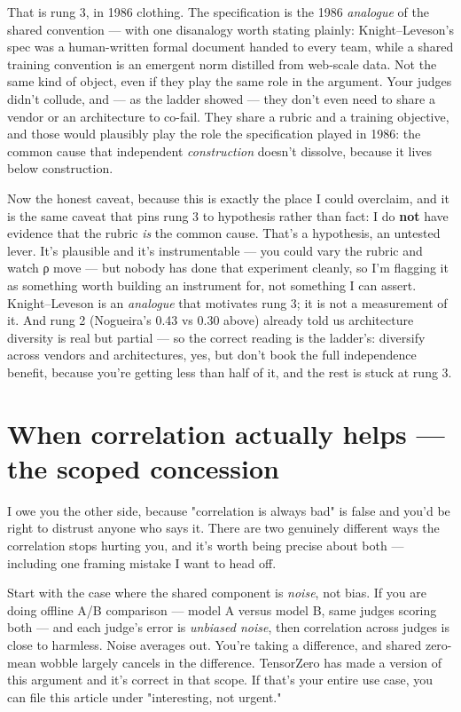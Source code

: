 \documentclass[11pt]{article}
\begin{document}
That is rung 3, in 1986 clothing. The specification is the 1986 \emph{analogue} of the shared convention — with one disanalogy worth stating plainly: Knight–Leveson's spec was a human-written formal document handed to every team, while a shared training convention is an emergent norm distilled from web-scale data. Not the same kind of object, even if they play the same role in the argument. Your judges didn't collude, and — as the ladder showed — they don't even need to share a vendor or an architecture to co-fail. They share a rubric and a training objective, and those would plausibly play the role the specification played in 1986: the common cause that independent \emph{construction} doesn't dissolve, because it lives below construction.

Now the honest caveat, because this is exactly the place I could overclaim, and it is the same caveat that pins rung 3 to hypothesis rather than fact: I do \textbf{not} have evidence that the rubric \emph{is} the common cause. That's a hypothesis, an untested lever. It's plausible and it's instrumentable — you could vary the rubric and watch ρ move — but nobody has done that experiment cleanly, so I'm flagging it as something worth building an instrument for, not something I can assert. Knight–Leveson is an \emph{analogue} that motivates rung 3; it is not a measurement of it. And rung 2 (Nogueira's 0.43 vs 0.30 above) already told us architecture diversity is real but partial — so the correct reading is the ladder's: diversify across vendors and architectures, yes, but don't book the full independence benefit, because you're getting less than half of it, and the rest is stuck at rung 3.

\section*{When correlation actually helps — the scoped concession}

I owe you the other side, because "correlation is always bad" is false and you'd be right to distrust anyone who says it. There are two genuinely different ways the correlation stops hurting you, and it's worth being precise about both — including one framing mistake I want to head off.

Start with the case where the shared component is \emph{noise}, not bias. If you are doing offline A/B comparison — model A versus model B, same judges scoring both — and each judge's error is \emph{unbiased noise}, then correlation across judges is close to harmless. Noise averages out. You're taking a difference, and shared zero-mean wobble largely cancels in the difference. TensorZero has made a version of this argument and it's correct in that scope. If that's your entire use case, you can file this article under "interesting, not urgent."
\end{document}
